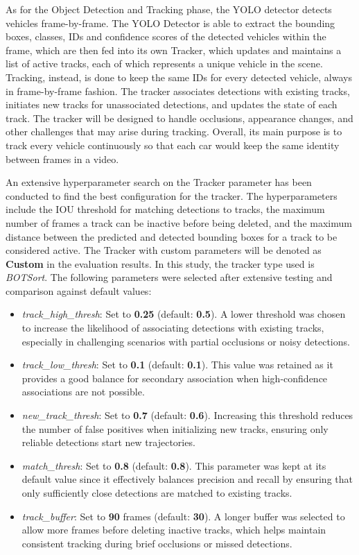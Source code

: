 As for the Object Detection and Tracking phase, the YOLO detector detects vehicles frame-by-frame. The YOLO Detector is able to extract the bounding boxes, classes, IDs and confidence scores of the detected vehicles within the frame, which are then fed into its own Tracker, which updates and maintains a list of active tracks, each of which represents a unique vehicle in the scene. Tracking, instead, is done to keep the same IDs for every detected vehicle, always in frame-by-frame fashion. The tracker associates detections with existing tracks, initiates new tracks for unassociated detections, and updates the state of each track. The tracker will be designed to handle occlusions, appearance changes, and other challenges that may arise during tracking. Overall, its main purpose is to track every vehicle continuously so that each car would keep the same identity between frames in a video.

An extensive hyperparameter search on the Tracker parameter has been conducted to find the best configuration for the tracker. The hyperparameters include the IOU threshold for matching detections to tracks, the maximum number of frames a track can be inactive before being deleted, and the maximum distance between the predicted and detected bounding boxes for a track to be considered active. The Tracker with custom parameters will be denoted as \textbf{Custom} in the evaluation results.
In this study, the tracker type used is \textit{BOTSort}. The following parameters were selected after extensive testing and comparison against default values:

\begin{itemize}
    \item \textit{track\_high\_thresh}: Set to \textbf{0.25} (default: \textbf{0.5}). A lower threshold was chosen to increase the likelihood of associating detections with existing tracks, especially in challenging scenarios with partial occlusions or noisy detections.
    \item \textit{track\_low\_thresh}: Set to \textbf{0.1} (default: \textbf{0.1}). This value was retained as it provides a good balance for secondary association when high-confidence associations are not possible.
    \item \textit{new\_track\_thresh}: Set to \textbf{0.7} (default: \textbf{0.6}). Increasing this threshold reduces the number of false positives when initializing new tracks, ensuring only reliable detections start new trajectories. 
    \item \textit{match\_thresh}: Set to \textbf{0.8} (default: \textbf{0.8}). This parameter was kept at its default value since it effectively balances precision and recall by ensuring that only sufficiently close detections are matched to existing tracks.
    \item \textit{track\_buffer}: Set to \textbf{90} frames (default: \textbf{30}). A longer buffer was selected to allow more frames before deleting inactive tracks, which helps maintain consistent tracking during brief occlusions or missed detections.
\end{itemize}

